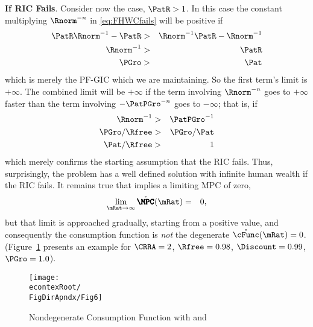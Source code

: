 \documentclass[../BufferStockTheory.tex]{subfiles}
\begin{document}
{\bf If RIC Fails}.  Consider now the  case, $\PatR > 1$.  In this case the constant multiplying
$\Rnorm^{-n}$ in \eqref{eq:FHWCfails} will be positive if
\begin{eqnarray*}
  \PatR \Rnorm^{-1} - \PatR & > &  \Rnorm^{-1}\PatR-\Rnorm^{-1}
\\ \Rnorm^{-1} & > & \PatR
\\ \PGro & > & \Pat
\end{eqnarray*}
which is merely the PF-GIC which we are maintaining.  So the first term's limit is $+\infty$.  The
combined limit will be $+\infty$ if the term involving $\Rnorm^{-n}$
goes to $+\infty$ faster than the term involving $-\PatPGro^{-n}$ goes to
$-\infty$; that is, if
\begin{eqnarray*}
  \Rnorm^{-1} & > & \PatPGro^{-1}
\\ \PGro/\Rfree & > & \PGro/\Pat
\\ \Pat/\Rfree & > & 1
\end{eqnarray*}
which merely confirms the starting assumption that the RIC fails.
Thus, surprisingly, the problem has a well defined solution with
infinite human wealth if the RIC fails.  It remains true that 
implies a limiting MPC of zero,
\begin{eqnarray}
  \lim_{\mRat \rightarrow \infty} \mathring{\pmb{\MPC}}(\mRat)  & = & 0,
\end{eqnarray}
but that limit is approached gradually, starting from a positive
value, and consequently the consumption function is {\it not} the
degenerate $\mathring{\cFunc}(\mRat)=0$.  (Figure~\ref{fig:PFGICHoldsFHWCFailsRICFails} presents an example for $\CRRA=2$, $\Rfree=0.98$, $\Discount = 0.99$, $\PGro = 1.0$).

\begin{figure}
  \centerline{\texttt{[image: \\econtexRoot/\\FigDirApndx/Fig6]}}
\caption{Nondegenerate Consumption Function with  and }
\label{fig:PFGICHoldsFHWCFailsRICFails}
\end{figure}
\end{document}
